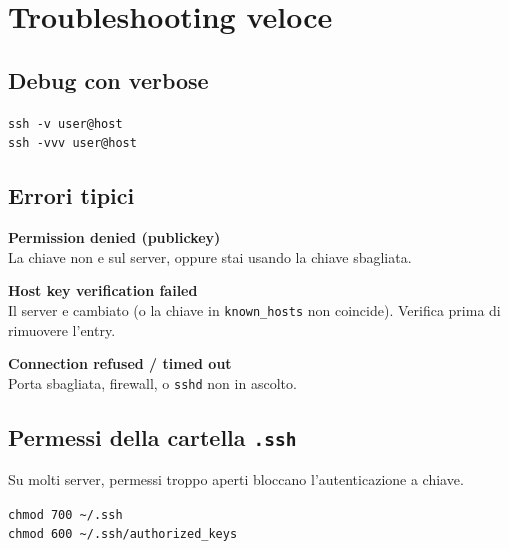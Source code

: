 \documentclass[a4paper,11pt]{article}
\begin{document}
\section{Troubleshooting veloce}
\subsection{Debug con verbose}
\begin{codebox}
\texttt{ssh -v user@host} \\
\texttt{ssh -vvv user@host}
\end{codebox}

\subsection{Errori tipici}
\begin{infobox}
\textbf{Permission denied (publickey)} \\
La chiave non e sul server, oppure stai usando la chiave sbagliata.

\medskip
\textbf{Host key verification failed} \\
Il server e cambiato (o la chiave in \texttt{known\_hosts} non coincide). Verifica prima di rimuovere l'entry.

\medskip
\textbf{Connection refused / timed out} \\
Porta sbagliata, firewall, o \texttt{sshd} non in ascolto.
\end{infobox}

\subsection{Permessi della cartella \texttt{.ssh}}
Su molti server, permessi troppo aperti bloccano l'autenticazione a chiave.
\begin{codebox}
\texttt{chmod 700 \textasciitilde/.ssh} \\
\texttt{chmod 600 \textasciitilde/.ssh/authorized\_keys}
\end{codebox}

\end{document}
